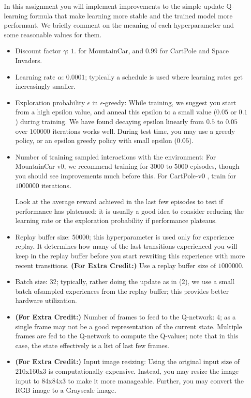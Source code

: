\documentclass[12pt]{article}
\begin{document}
In this assignment you will implement improvements to the simple update Q-learning formula that make learning more stable and the trained model more performant. We briefly comment on the meaning of each hyperparameter and some reasonable values for them.
\begin{itemize}
	\item Discount factor $\gamma$: $1.$ for MountainCar, and $0.99$ for CartPole and Space Invaders. 
	\item Learning rate $\alpha$: $0.0001$; typically a schedule is used where learning rates get increasingly smaller. 
    \item Exploration probability $\epsilon$ in $\epsilon$-greedy: 
    While training, we suggest you start from a high epsilon value, and anneal this epsilon to a small value ($0.05$ or $0.1$) during training. 
    We have found decaying epsilon linearly from $0.5$ to $0.05$ over $100000$  iterations works well. 
    During test time, you may use a greedy policy, or an epsilon greedy policy with small epsilon ($0.05$).
    
	\item Number of training sampled interactions with the environment: 
	For MountainCar-v0, we recommend training for $3000$ to $5000$ episodes, though you should see improvements much before this. For CartPole-v0
	, train for $1000000$ iterations. 
	
	Look at the average reward achieved in the last few episodes  to test if performance has plateaued; it is usually a 
    good idea to consider reducing the learning rate or the exploration 
	probability if performance plateaus.
 	
 	\item Replay buffer size: $50000$; 
	this hyperparameter is used only for experience replay. It determines how many of the last transitions experienced you will keep in the replay buffer before you start rewriting this experience with more recent transitions. \textbf{(For Extra Credit:) } Use a replay buffer size of $1000000$.
	
	\item Batch size:  32;  typically, rather doing the update as in (2), we use a small batch ofsampled experiences from the replay buffer; this provides better hardware utilization.
	
 	\item \textbf{(For Extra Credit:) }Number of frames to feed to the Q-network: $4$; as a single frame may not be a good representation of the current state. 
    Multiple frames are fed to the Q-network to compute the Q-values; note that in this case, the state effectively is a list of last few frames.
    
    \item \textbf{(For Extra Credit:) } Input  image  resizing:  Using the original input size of 210x160x3 is computationally expensive. Instead, you may resize the image input to 84x84x3 to make it more manageable. Further, you may convert the RGB image to a Grayscale image.
    

\end{itemize}
\end{document}
